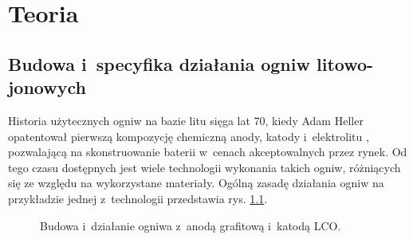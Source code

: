 \documentclass[polish,engineer]{polsl-msth}
\begin{document}
\chapter{Teoria}
\section{Budowa i~specyfika działania ogniw litowo-jonowych}
Historia użytecznych ogniw na bazie litu sięga lat 70, kiedy Adam Heller opatentował pierwszą kompozycję chemiczną anody, katody i~elektrolitu \cite{heller1975electrochemical}, pozwalającą na skonstruowanie baterii w~cenach akceptowalnych przez rynek. Od tego czasu dostępnych jest wiele technologii wykonania takich ogniw, różniących się ze względu na wykorzystane materiały. Ogólną zasadę działania ogniw na przykładzie jednej z~technologii przedstawia rys. \ref{img:liion_structure}.
\begin{figure}[hbtp]
\centering
     \caption{Budowa i~działanie ogniwa z~anodą grafitową i~katodą LCO. \cite{liionpic_wikimedia}  \label{img:liion_structure}}
\end{figure}
\end{document}
